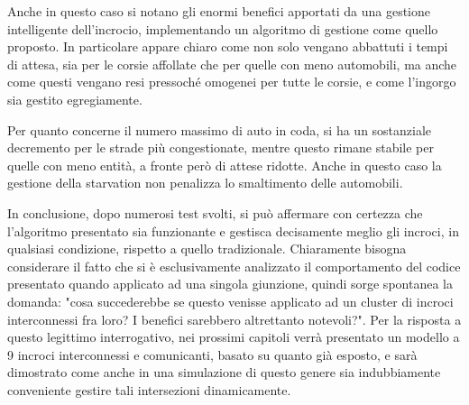 Anche in questo caso si notano gli enormi benefici apportati da una gestione intelligente dell'incrocio, implementando un algoritmo di gestione come quello proposto. In particolare appare chiaro come non solo vengano abbattuti i tempi di attesa, sia per le corsie affollate che per quelle con meno automobili, ma anche come questi vengano resi pressoché omogenei per tutte le corsie, e come l'ingorgo sia gestito egregiamente.

Per quanto concerne il numero massimo di auto in coda, si ha un sostanziale decremento per le strade più congestionate, mentre questo rimane stabile per quelle con meno entità, a fronte però di attese ridotte. Anche in questo caso la gestione della starvation non penalizza lo smaltimento delle automobili.
\newline

In conclusione, dopo numerosi test svolti, si può affermare con certezza che l'algoritmo presentato sia funzionante e gestisca decisamente meglio gli incroci, in qualsiasi condizione, rispetto a quello tradizionale. Chiaramente bisogna considerare il fatto che si è esclusivamente analizzato il comportamento del codice presentato quando applicato ad una singola giunzione, quindi sorge spontanea la domanda: "cosa succederebbe se questo venisse applicato ad un cluster di incroci interconnessi fra loro? I benefici sarebbero altrettanto notevoli?". Per la risposta a questo legittimo interrogativo, nei prossimi capitoli verrà presentato un modello a 9 incroci interconnessi e comunicanti, basato su quanto già esposto, e sarà dimostrato come anche in una simulazione di questo genere sia indubbiamente conveniente gestire tali intersezioni dinamicamente.


























